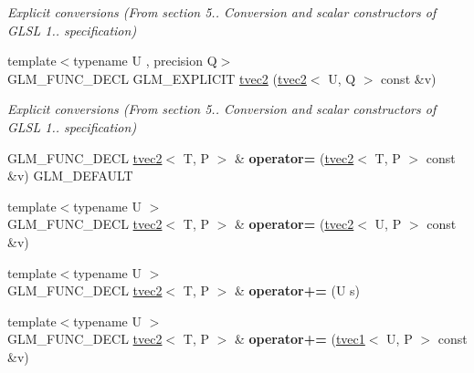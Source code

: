 \begin{DoxyCompactItemize}
\begin{DoxyCompactList}\small\item\em Explicit conversions (From section 5.. Conversion and scalar constructors of G\-L\-S\-L 1.. specification) \end{DoxyCompactList}\item 
\hypertarget{structglm_1_1tvec2_ade5fee8102e97b6e189ac72d2e10b2d9}{{\footnotesize template$<$typename U , precision Q$>$ }\\G\-L\-M\-\_\-\-F\-U\-N\-C\-\_\-\-D\-E\-C\-L G\-L\-M\-\_\-\-E\-X\-P\-L\-I\-C\-I\-T \hyperlink{structglm_1_1tvec2_ade5fee8102e97b6e189ac72d2e10b2d9}{tvec2} (\hyperlink{structglm_1_1tvec2}{tvec2}$<$ U, Q $>$ const \&v)}\label{structglm_1_1tvec2_ade5fee8102e97b6e189ac72d2e10b2d9}

\begin{DoxyCompactList}\small\item\em Explicit conversions (From section 5.. Conversion and scalar constructors of G\-L\-S\-L 1.. specification) \end{DoxyCompactList}\item 
\hypertarget{structglm_1_1tvec2_a83295be3cd199dc72b7a19966a0c8334}{G\-L\-M\-\_\-\-F\-U\-N\-C\-\_\-\-D\-E\-C\-L \hyperlink{structglm_1_1tvec2}{tvec2}$<$ T, P $>$ \& {\bfseries operator=} (\hyperlink{structglm_1_1tvec2}{tvec2}$<$ T, P $>$ const \&v) G\-L\-M\-\_\-\-D\-E\-F\-A\-U\-L\-T}\label{structglm_1_1tvec2_a83295be3cd199dc72b7a19966a0c8334}

\item 
\hypertarget{structglm_1_1tvec2_a90eca373f8d7c27d73412f242cf1551e}{{\footnotesize template$<$typename U $>$ }\\G\-L\-M\-\_\-\-F\-U\-N\-C\-\_\-\-D\-E\-C\-L \hyperlink{structglm_1_1tvec2}{tvec2}$<$ T, P $>$ \& {\bfseries operator=} (\hyperlink{structglm_1_1tvec2}{tvec2}$<$ U, P $>$ const \&v)}\label{structglm_1_1tvec2_a90eca373f8d7c27d73412f242cf1551e}

\item 
\hypertarget{structglm_1_1tvec2_af56749a307930b1e45c2f61d7af476c2}{{\footnotesize template$<$typename U $>$ }\\G\-L\-M\-\_\-\-F\-U\-N\-C\-\_\-\-D\-E\-C\-L \hyperlink{structglm_1_1tvec2}{tvec2}$<$ T, P $>$ \& {\bfseries operator+=} (U s)}\label{structglm_1_1tvec2_af56749a307930b1e45c2f61d7af476c2}

\item 
\hypertarget{structglm_1_1tvec2_a260a29a9ba826d24f418f01ebd274d39}{{\footnotesize template$<$typename U $>$ }\\G\-L\-M\-\_\-\-F\-U\-N\-C\-\_\-\-D\-E\-C\-L \hyperlink{structglm_1_1tvec2}{tvec2}$<$ T, P $>$ \& {\bfseries operator+=} (\hyperlink{structglm_1_1tvec1}{tvec1}$<$ U, P $>$ const \&v)}\label{structglm_1_1tvec2_a260a29a9ba826d24f418f01ebd274d39}


\end{DoxyCompactItemize}
